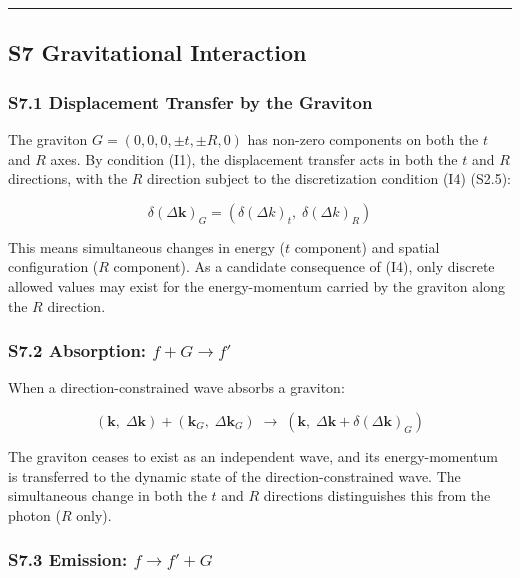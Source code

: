 \documentclass[
  a4paper,11pt]{article}
\theoremstyle{definition}
\theoremstyle{remark}
\begin{document}
\begin{center}\rule{0.5\linewidth}{0.5pt}\end{center}

\subsection{S7 Gravitational
Interaction}\label{s7-gravitational-interaction}

\subsubsection{S7.1 Displacement Transfer by the
Graviton}\label{s7.1-displacement-transfer-by-the-graviton}

The graviton \(G = (0, 0, 0, \pm t, \pm R, 0)\) has non-zero components
on both the \(t\) and \(R\) axes. By condition (I1), the displacement
transfer acts in both the \(t\) and \(R\) directions, with the \(R\)
direction subject to the discretization condition (I4) (S2.5):

\[\delta(\Delta\mathbf{k})_G = (\delta(\Delta k)_t,\; \delta(\Delta k)_R)\]

This means simultaneous changes in energy (\(t\) component) and spatial
configuration (\(R\) component). As a candidate consequence of (I4),
only discrete allowed values may exist for the energy-momentum carried
by the graviton along the \(R\) direction.

\subsubsection{\texorpdfstring{S7.2 Absorption:
\(f + G \to f'\)}{S7.2 Absorption: f + G \textbackslash to f\textquotesingle{}}}\label{s7.2-absorption-f-g-to-f}

When a direction-constrained wave absorbs a graviton:

\[(\mathbf{k},\; \Delta\mathbf{k}) + (\mathbf{k}_G,\; \Delta\mathbf{k}_G) \;\longrightarrow\; (\mathbf{k},\; \Delta\mathbf{k} + \delta(\Delta\mathbf{k})_G)\]

The graviton ceases to exist as an independent wave, and its
energy-momentum is transferred to the dynamic state of the
direction-constrained wave. The simultaneous change in both the \(t\)
and \(R\) directions distinguishes this from the photon (\(R\) only).

\subsubsection{\texorpdfstring{S7.3 Emission:
\(f \to f' + G\)}{S7.3 Emission: f \textbackslash to f\textquotesingle{} + G}}\label{s7.3-emission-f-to-f-g}
\end{document}
